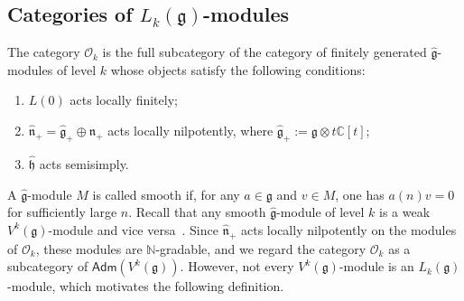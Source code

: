 \documentclass[12pt,a4paper,reqno]{amsart}
\numberwithin{equation}{section}
\theoremstyle{definition}
\newcommand{\g}{\mathfrak{g}}
\newcommand{\C}{\mathbb{C}}
\newcommand{\N}{\mathbb{N}}
\def\O{\mathcal{O}}
\def\Adm{\mathsf{Adm}}
\def\o{\otimes}
\def\op{\oplus}
\def\n{\mathfrak{n}}
\begin{document}
\subsection{Categories of $L_k(\g)$-modules}
The category $\O_k$ is the full subcategory of the category of finitely generated $\hat{\g}$-modules of level $k$ whose objects satisfy the following conditions:
\begin{enumerate}
    \item $L(0)$ acts locally finitely;
    \item $\hat{\n}_+=\hat{\g}_+\op \mathfrak{n}_+$ acts locally nilpotently, where $\hat{\g}_+:=\g\o t\C[t]$;
    \item $\hat{\mathfrak{h}}$ acts semisimply.
\end{enumerate}

A $\hat{\g}$-module $M$ is called smooth if, for any $a\in \g$ and $v\in M$, one has $a(n)v=0$ for sufficiently large $n$. Recall that any smooth $\hat{\g}$-module of level $k$ is a weak $V^k(\g)$-module and vice versa~\cite[p.5]{A16}. Since $\hat{\n}_+$ acts locally nilpotently on the modules of $\O_k$, these modules are $\N$-gradable, and we regard the category $\O_k$ as a subcategory of $\Adm(V^k(\g))$. However, not every $V^k(\g)$-module is an $L_k(\g)$-module, which motivates the following definition.
\end{document}
